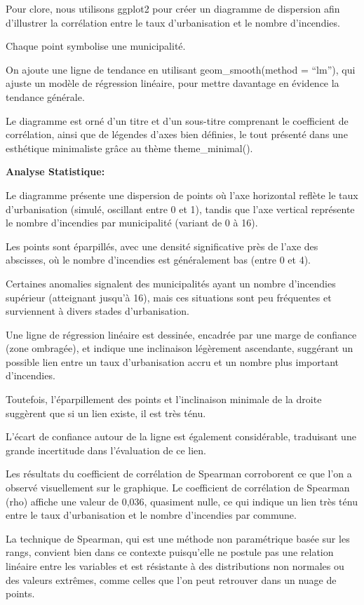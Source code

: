 \documentclass[
]{article}
\begin{document}
Pour clore, nous utilisons ggplot2 pour créer un diagramme de dispersion
afin d'illustrer la corrélation entre le taux d'urbanisation et le
nombre d'incendies.

Chaque point symbolise une municipalité.

On ajoute une ligne de tendance en utilisant geom\_smooth(method =
``lm''), qui ajuste un modèle de régression linéaire, pour mettre
davantage en évidence la tendance générale.

Le diagramme est orné d'un titre et d'un sous-titre comprenant le
coefficient de corrélation, ainsi que de légendes d'axes bien définies,
le tout présenté dans une esthétique minimaliste grâce au thème
theme\_minimal().

\textbf{Analyse Statistique:}

Le diagramme présente une dispersion de points où l'axe horizontal
reflète le taux d'urbanisation (simulé, oscillant entre 0 et 1), tandis
que l'axe vertical représente le nombre d'incendies par municipalité
(variant de 0 à 16).

Les points sont éparpillés, avec une densité significative près de l'axe
des abscisses, où le nombre d'incendies est généralement bas (entre 0 et
4).

Certaines anomalies signalent des municipalités ayant un nombre
d'incendies supérieur (atteignant jusqu'à 16), mais ces situations sont
peu fréquentes et surviennent à divers stades d'urbanisation.

Une ligne de régression linéaire est dessinée, encadrée par une marge de
confiance (zone ombragée), et indique une inclinaison légèrement
ascendante, suggérant un possible lien entre un taux d'urbanisation
accru et un nombre plus important d'incendies.

Toutefois, l'éparpillement des points et l'inclinaison minimale de la
droite suggèrent que si un lien existe, il est très ténu.

L'écart de confiance autour de la ligne est également considérable,
traduisant une grande incertitude dans l'évaluation de ce lien.

Les résultats du coefficient de corrélation de Spearman corroborent ce
que l'on a observé visuellement sur le graphique. Le coefficient de
corrélation de Spearman (rho) affiche une valeur de 0,036, quasiment
nulle, ce qui indique un lien très ténu entre le taux d'urbanisation et
le nombre d'incendies par commune.

La technique de Spearman, qui est une méthode non paramétrique basée sur
les rangs, convient bien dans ce contexte puisqu'elle ne postule pas une
relation linéaire entre les variables et est résistante à des
distributions non normales ou des valeurs extrêmes, comme celles que
l'on peut retrouver dans un nuage de points.
\end{document}
